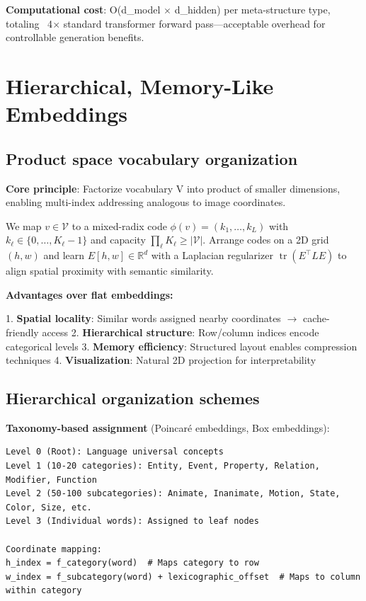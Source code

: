 \documentclass[11pt]{article}
\begin{document}
\textbf{Computational cost}: O(d_model \(\times\) d_hidden) per meta-structure type, totaling ~4\(\times\) standard transformer forward pass—acceptable overhead for controllable generation benefits.

\section{Hierarchical, Memory-Like Embeddings}

\subsection{Product space vocabulary organization}

\textbf{Core principle}: Factorize vocabulary V into product of smaller dimensions, enabling multi-index addressing analogous to image coordinates.

We map $v\in\mathcal{V}$ to a mixed-radix code $\phi(v){=}(k_1,\ldots,k_L)$ with $k_\ell\in\{0,\ldots,K_\ell{-}1\}$ and capacity $\prod_\ell K_\ell\ge |\mathcal{V}|$. Arrange codes on a 2D grid $(h,w)$ and learn $E[h,w]\in\mathbb{R}^d$ with a Laplacian regularizer $\operatorname{tr}(E^\top L E)$ to align spatial proximity with semantic similarity.

\textbf{Advantages over flat embeddings:}

1. \textbf{Spatial locality}: Similar words assigned nearby coordinates \(\to\) cache-friendly access
2. \textbf{Hierarchical structure}: Row/column indices encode categorical levels
3. \textbf{Memory efficiency}: Structured layout enables compression techniques
4. \textbf{Visualization}: Natural 2D projection for interpretability

\subsection{Hierarchical organization schemes}

\textbf{Taxonomy-based assignment} (Poincaré embeddings, Box embeddings):

\begin{verbatim}
Level 0 (Root): Language universal concepts
Level 1 (10-20 categories): Entity, Event, Property, Relation, Modifier, Function
Level 2 (50-100 subcategories): Animate, Inanimate, Motion, State, Color, Size, etc.
Level 3 (Individual words): Assigned to leaf nodes

Coordinate mapping:
h_index = f_category(word)  # Maps category to row
w_index = f_subcategory(word) + lexicographic_offset  # Maps to column within category
\end{verbatim}
\end{document}
